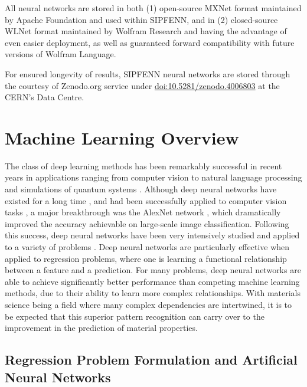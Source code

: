 All neural networks are stored in both (1) open-source MXNet format maintained by Apache Foundation and used within SIPFENN, and in (2) closed-source WLNet format maintained by Wolfram Research and having the advantage of even easier deployment, as well as guaranteed forward compatibility with future versions of Wolfram Language.

For ensured longevity of results, SIPFENN neural networks are stored through the courtesy of Zenodo.org service under \hyperlink{doi:10.5281/zenodo.4006803}{doi:10.5281/zenodo.4006803} at the CERN’s Data Centre.


\section{Machine Learning Overview} \label{sipfenn:appedix1}
The class of deep learning methods has been remarkably successful in recent years in applications ranging from computer vision to natural language processing and simulations of quantum systems \cite{lecun2015deep,silver2016mastering,devlin2018bert,carleo2017solving}. Although deep neural networks have existed for a long time \cite{rosenblatt1958perceptron}, and had been successfully applied to computer vision tasks \cite{lecun1995comparison,lecun1990handwritten,lecun1998gradient}, a major breakthrough was the AlexNet network \cite{krizhevsky2012imagenet}, which dramatically improved the accuracy achievable on large-scale image classification. Following this success, deep neural networks have been very intensively studied and applied to a variety of problems \cite{lecun2015deep,silver2016mastering,devlin2018bert}. Deep neural networks are particularly effective when applied to regression problems, where one is learning a functional relationship between a feature and a prediction. For many problems, deep neural networks are able to achieve significantly better performance than competing machine learning methods, due to their ability to learn more complex relationships. With materials science being a field where many complex dependencies are intertwined, it is to be expected that this superior pattern recognition can carry over to the improvement in the prediction of material properties.

\subsection{Regression Problem Formulation and Artificial Neural Networks}
\label{sipfenn:ssec:regressionformulation}

